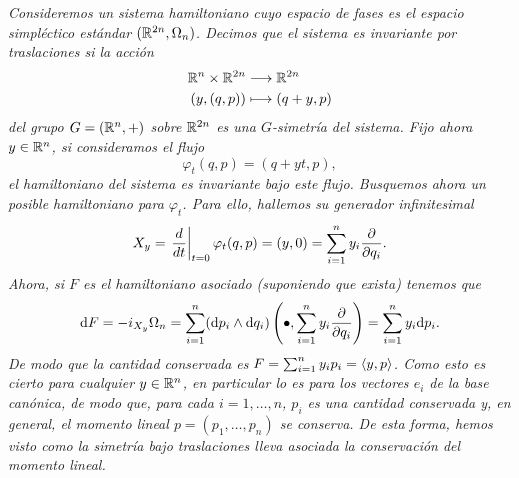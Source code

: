 \begin{ejemplo}
  \em
  Consideremos un sistema hamiltoniano cuyo espacio de fases es el espacio simpléctico estándar $(\mathbb{R}^{2n},\Omega_n)$. Decimos que el sistema es \emph{invariante por traslaciones} si la acción
  \begin{align*}
    \mathbb{R}^n\times \mathbb{R}^{2n}&\longrightarrow \mathbb{R}^{2n}\\ 
      (y,(q,p)) &\longmapsto (q+y,p) 
    \end{align*}
del grupo $G=(\mathbb{R}^n,+)$ sobre $\mathbb{R}^{2n}$ es una $G$-simetría del sistema. Fijo ahora $y\in \mathbb{R}^n$, si consideramos el flujo
\begin{equation*}
  \varphi_t(q,p)=(q+yt,p),
\end{equation*}
el hamiltoniano del sistema es invariante bajo este flujo. Busquemos ahora un posible hamiltoniano para $\varphi_t$. Para ello, hallemos su generador infinitesimal
\begin{equation*}
  X_y=\left.\frac{d}{dt}\right|_{t=0}\varphi_t(q,p)=(y,0)=\sum_{i=1}^n y_i \frac{\partial}{\partial q_i}.
\end{equation*}
Ahora, si $F$ es el hamiltoniano asociado (suponiendo que exista) tenemos que
\begin{equation*}
  \mathrm{d} F=-i_{X_y}\Omega_n=\sum_{i=1}^n(\mathrm{d} p_i \wedge \mathrm{d} q_i)\left(\bullet,\sum_{i=1}^n y_i\frac{\partial}{\partial q_i} \right)=\sum_{i=1}^n y_i \mathrm{d} p_i.
\end{equation*}
De modo que la cantidad conservada es $F=\sum_{i=1}^n y_i p_i=\left\langle y,p\right\rangle$. Como esto es cierto para cualquier $y\in \mathbb{R}^n$, en particular lo es para los vectores $e_i$ de la base canónica, de modo que, para cada $i=1,\dots,n$, $p_i$ es una cantidad conservada y, en general, el \emph{momento lineal} $p=(p_1,\dots,p_n)$ se conserva. De esta forma, hemos visto como la simetría bajo traslaciones lleva asociada la conservación del momento lineal.
\end{ejemplo}

